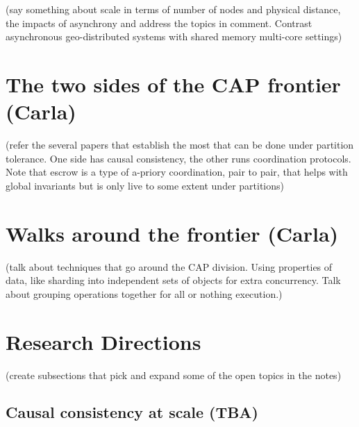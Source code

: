 \begin{bibunit}
        (say something about scale in terms of number of nodes and physical distance, the impacts of asynchrony and address the topics in comment. Contrast asynchronous geo-distributed systems with shared memory multi-core settings)

        \section{The two sides of the CAP frontier (Carla)}\label{sec:2}


        (refer the several papers that establish the most that can be done under partition tolerance. One side has causal consistency, the other runs coordination protocols. Note that escrow is a type of a-priory coordination, pair to pair, that helps with global invariants but is only live to some extent under partitions)

        \section{Walks around the frontier (Carla)}\label{sec:2}


        (talk about techniques that go around the CAP division. Using properties of data, like sharding into independent sets of objects for extra concurrency. Talk about grouping operations together for all or nothing execution.)

        \section{Research Directions}\label{sec:2}

        (create subsections that pick and expand some of the open topics in the notes)

        \subsection{Causal consistency at scale (TBA)}


\end{bibunit}
